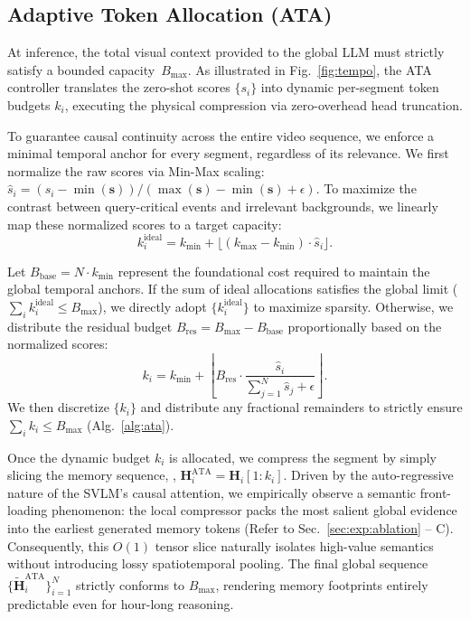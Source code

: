 \subsection{Adaptive Token Allocation (ATA)}
\label{sec:method:ata}

At inference, the total visual context provided to the global LLM must strictly satisfy a bounded capacity~$B_{\max}$. As illustrated in Fig.~\ref{fig:tempo}, the ATA controller translates the zero-shot scores $\{s_i\}$ into dynamic per-segment token budgets $k_i$, executing the physical compression via zero-overhead head truncation.

To guarantee causal continuity across the entire video sequence, we enforce a minimal temporal anchor for every segment, regardless of its relevance. We first normalize the raw scores via Min-Max scaling: $\hat{s}_i = (s_i-\min(\mathbf{s})) / (\max(\mathbf{s})-\min(\mathbf{s})+\epsilon)$. To maximize the contrast between query-critical events and irrelevant backgrounds, we linearly map these normalized scores to a target capacity:
%
\begin{equation}
k_i^{\mathrm{ideal}} = k_{\min} + \lfloor (k_{\max}-k_{\min}) \cdot \hat{s}_i \rfloor.
\label{eq:ideal_alloc}
\end{equation}

Let $B_{\mathrm{base}}=N\cdot k_{\min}$ represent the foundational cost required to maintain the global temporal anchors. If the sum of ideal allocations satisfies the global limit ($\sum_i k_i^{\mathrm{ideal}} \le B_{\max}$), we directly adopt $\{k_i^{\mathrm{ideal}}\}$ to maximize sparsity. Otherwise, we distribute the residual budget $B_{\mathrm{res}}=B_{\max}-B_{\mathrm{base}}$ proportionally based on the normalized scores:
\begin{equation}
k_i = k_{\min} + \left\lfloor B_{\mathrm{res}} \cdot \frac{\hat{s}_i}{\sum_{j=1}^{N}\hat{s}_j+\epsilon} \right\rfloor.
\label{eq:soft_alloc}
\end{equation}
We then discretize $\{k_i\}$ and distribute any fractional remainders to strictly ensure $\sum_i k_i \le B_{\max}$ (Alg.~\ref{alg:ata}).



Once the dynamic budget $k_i$ is allocated, we compress the segment by simply slicing the memory sequence, \ie, $\mathbf{H}_i^{\mathrm{ATA}} = \mathbf{H}_i[1{:}k_i]$. Driven by the auto-regressive nature of the SVLM's causal attention, we empirically observe a semantic front-loading phenomenon: the local compressor packs the most salient global evidence into the earliest generated memory tokens (Refer to Sec.~\ref{sec:exp:ablation} -- C). Consequently, this $O(1)$ tensor slice naturally isolates high-value semantics without introducing lossy spatiotemporal pooling. The final global sequence $\{\tilde{\mathbf{H}}_i^{\mathrm{ATA}}\}_{i=1}^{N}$ strictly conforms to $B_{\max}$, rendering memory footprints entirely predictable even for hour-long reasoning. 